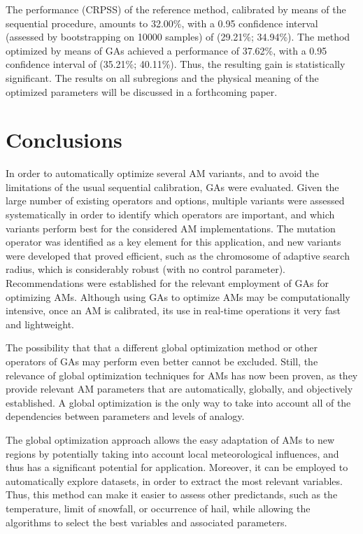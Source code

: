 \documentclass{ametsoc}
\begin{document}
The performance (CRPSS) of the reference method, calibrated by means of the sequential procedure, amounts to 32.00\%, with a 0.95 confidence interval (assessed by bootstrapping on 10000 samples) of (29.21\%; 34.94\%). The method optimized by means of GAs achieved a performance of 37.62\%, with a 0.95 confidence interval of (35.21\%; 40.11\%). Thus, the resulting gain is statistically significant. The results on all subregions and the physical meaning of the optimized parameters will be discussed in a forthcoming paper.


\section{Conclusions}
\label{sec:conclusions}

In order to automatically optimize several AM variants, and to avoid the limitations of the usual sequential calibration, GAs were evaluated. Given the large number of existing operators and options, multiple variants were assessed systematically in order to identify which operators are important, and which variants perform best for the considered AM implementations. The mutation operator was identified as a key element for this application, and new variants were developed that proved efficient, such as the chromosome of adaptive search radius, which is considerably robust (with no control parameter). Recommendations were established for the relevant employment of GAs for optimizing AMs. Although using GAs to optimize AMs may be computationally intensive, once an AM is calibrated, its use in real-time operations it very fast and lightweight.

The possibility that that a different global optimization method or other operators of GAs may perform even better cannot be excluded. Still, the relevance of global optimization techniques for AMs has now been proven, as they provide relevant AM parameters that are automatically, globally, and objectively established. A global optimization is the only way to take into account all of the dependencies between parameters and levels of analogy.

The global optimization approach allows the easy adaptation of AMs to new regions by potentially taking into account local meteorological influences, and thus has a significant potential for application. Moreover, it can be employed to automatically explore datasets, in order to extract the most relevant variables. Thus, this method can make it easier to assess other predictands, such as the temperature, limit of snowfall, or occurrence of hail, while allowing the algorithms to select the best variables and associated parameters.
\end{document}
